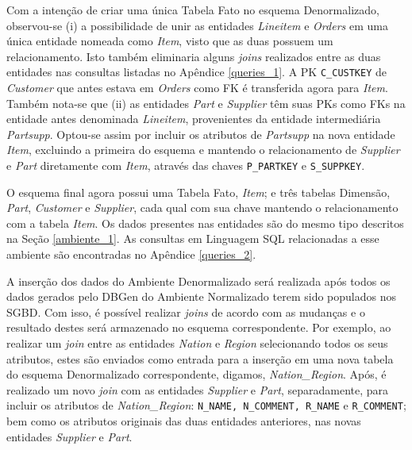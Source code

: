 Com a intenção de criar uma única Tabela Fato no esquema Denormalizado, observou-se (i) a possibilidade de unir as entidades \textit{Lineitem} e \textit{Orders} em uma única entidade nomeada como \textit{Item}, visto que as duas possuem um relacionamento. Isto também eliminaria alguns \textit{joins} realizados entre as duas entidades nas consultas listadas no Apêndice \ref{queries_1}. A PK \texttt{C\_CUSTKEY} de \textit{Customer} que antes estava em \textit{Orders} como FK é transferida agora para \textit{Item}. Também nota-se que (ii) as entidades \textit{Part} e \textit{Supplier} têm suas PKs como FKs na entidade antes denominada \textit{Lineitem}, provenientes da entidade intermediária \textit{Partsupp}. Optou-se assim por incluir os atributos de \textit{Partsupp} na nova entidade \textit{Item}, excluindo a primeira do esquema e mantendo o relacionamento de \textit{Supplier} e \textit{Part} diretamente com \textit{Item}, através das chaves \texttt{P\_PARTKEY} e \texttt{S\_SUPPKEY}.

O esquema final agora possui uma Tabela Fato, \textit{Item}; e três tabelas Dimensão, \textit{Part}, \textit{Customer} e \textit{Supplier}, cada qual com sua chave mantendo o relacionamento com a tabela \textit{Item}. Os dados presentes nas entidades são do mesmo tipo descritos na Seção \ref{ambiente_1}. As consultas em Linguagem SQL relacionadas a esse ambiente são encontradas no Apêndice \ref{queries_2}.

A inserção dos dados do Ambiente Denormalizado será realizada após todos os dados gerados pelo DBGen do Ambiente Normalizado terem sido populados nos SGBD. Com isso, é possível realizar \textit{joins} de acordo com as mudanças e o resultado destes será armazenado no esquema correspondente. Por exemplo, ao realizar um \textit{join} entre as entidades \textit{Nation} e \textit{Region} selecionando todos os seus atributos, estes são enviados como entrada para a inserção em uma nova tabela do esquema Denormalizado correspondente, digamos, \textit{Nation\_Region}. Após, é realizado um novo \textit{join} com as entidades \textit{Supplier} e \textit{Part}, separadamente, para incluir os atributos de \textit{Nation\_Region}: \texttt{N\_NAME, N\_COMMENT, R\_NAME} e \texttt{R\_COMMENT}; bem como os atributos originais das duas entidades anteriores, nas novas entidades \textit{Supplier} e \textit{Part}.